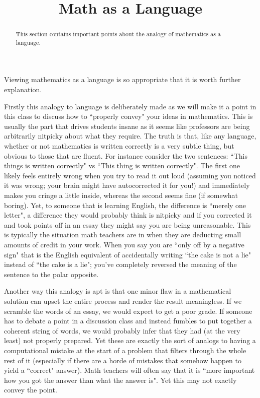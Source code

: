 \documentclass{ximeraXloud}
\title{Math as a Language}
\begin{document}
\begin{abstract}
    This section contains important points about the analogy of mathematics as a language.
\end{abstract}
\maketitle

Viewing mathematics as a language is so appropriate that it is worth further explanation.%

Firstly this analogy to language is deliberately made as we will make it a point in this class to discuss how to ``properly convey" your ideas in mathematics. This is usually the part that drives students insane as it seems like professors are being arbitrarily nitpicky about what they require. The truth is that, like any language, whether or not mathematics is written correctly is a very subtle thing, but obvious to those that are fluent. For instance consider the two sentences: ``This things is written correctly" vs ``This thing is written correctly". The first one likely feels entirely wrong when you try to read it out loud (assuming you noticed it was wrong; your brain might have autocorrected it for you!) and immediately makes you cringe a little inside, whereas the second seems fine (if somewhat boring). Yet, to someone that is learning English, the difference is ``merely one letter", a difference they would probably think is nitpicky and if you corrected it and took points off in an essay they might say you are being unreasonable. This is typically the situation math teachers are in when they are deducting small amounts of credit in your work. When you say you are ``only off by a negative sign" that is the English equivalent of accidentally writing ``the cake is not a lie" instead of ``the cake is a lie"; you've completely reversed the meaning of the sentence to the polar opposite.

Another way this analogy is apt is that one minor flaw in a mathematical solution can upset the entire process and render the result meaningless. If we scramble the words of an essay, we would expect to get a poor grade. If someone has to debate a point in a discussion class and instead fumbles to put together a coherent string of words, we would probably infer that they had (at the very least) not properly prepared. Yet these are exactly the sort of analogs to having a computational mistake at the start of a problem that filters through the whole rest of it (especially if there are a horde of mistakes that somehow happen to yield a ``correct" answer). Math teachers will often say that it is ``more important how you got the answer than what the answer is". Yet this may not exactly convey the point.
\end{document}
